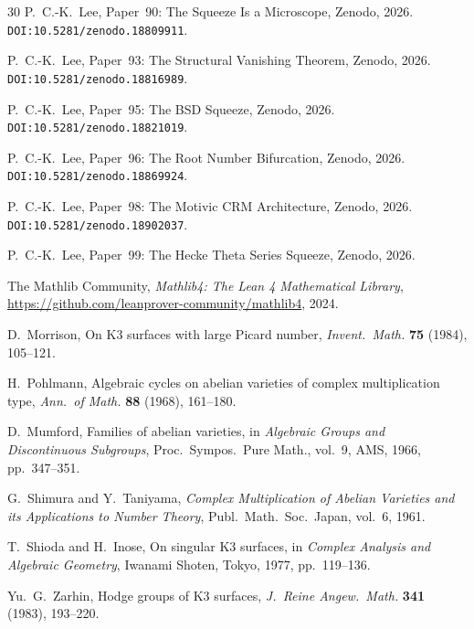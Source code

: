 \documentclass[11pt,a4paper]{article}
\theoremstyle{plain}
\theoremstyle{definition}
\begin{document}
\begin{thebibliography}{30}
P.~C.-K.~Lee,
Paper~90: The Squeeze Is a Microscope,
Zenodo, 2026. \texttt{DOI:10.5281/zenodo.18809911}.

P.~C.-K.~Lee,
Paper~93: The Structural Vanishing Theorem,
Zenodo, 2026. \texttt{DOI:10.5281/zenodo.18816989}.

P.~C.-K.~Lee,
Paper~95: The BSD Squeeze,
Zenodo, 2026. \texttt{DOI:10.5281/zenodo.18821019}.

P.~C.-K.~Lee,
Paper~96: The Root Number Bifurcation,
Zenodo, 2026. \texttt{DOI:10.5281/zenodo.18869924}.

P.~C.-K.~Lee,
Paper~98: The Motivic CRM Architecture,
Zenodo, 2026. \texttt{DOI:10.5281/zenodo.18902037}.

P.~C.-K.~Lee,
Paper~99: The Hecke Theta Series Squeeze,
Zenodo, 2026.

The Mathlib Community,
\emph{Mathlib4: The Lean 4 Mathematical Library},
\url{https://github.com/leanprover-community/mathlib4}, 2024.

D.~Morrison,
On K3 surfaces with large Picard number,
\emph{Invent.\ Math.} \textbf{75} (1984), 105--121.

H.~Pohlmann,
Algebraic cycles on abelian varieties of complex multiplication type,
\emph{Ann.\ of Math.} \textbf{88} (1968), 161--180.

D.~Mumford,
Families of abelian varieties,
in \emph{Algebraic Groups and Discontinuous Subgroups}, Proc.\ Sympos.\ Pure Math., vol.~9, AMS, 1966, pp.~347--351.

G.~Shimura and Y.~Taniyama,
\emph{Complex Multiplication of Abelian Varieties and its Applications to Number Theory},
Publ.\ Math.\ Soc.\ Japan, vol.~6, 1961.

T.~Shioda and H.~Inose,
On singular K3 surfaces,
in \emph{Complex Analysis and Algebraic Geometry}, Iwanami Shoten, Tokyo, 1977, pp.~119--136.

Yu.~G.~Zarhin,
Hodge groups of K3 surfaces,
\emph{J.\ Reine Angew.\ Math.} \textbf{341} (1983), 193--220.

\end{thebibliography}
\end{document}
